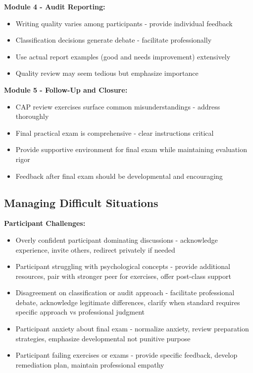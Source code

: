 \documentclass[11pt,a4paper]{article}
\begin{document}
\textbf{Module 4 - Audit Reporting:}
\begin{itemize}
\item Writing quality varies among participants - provide individual feedback
\item Classification decisions generate debate - facilitate professionally
\item Use actual report examples (good and needs improvement) extensively
\item Quality review may seem tedious but emphasize importance
\end{itemize}

\textbf{Module 5 - Follow-Up and Closure:}
\begin{itemize}
\item CAP review exercises surface common misunderstandings - address thoroughly
\item Final practical exam is comprehensive - clear instructions critical
\item Provide supportive environment for final exam while maintaining evaluation rigor
\item Feedback after final exam should be developmental and encouraging
\end{itemize}

\subsection{Managing Difficult Situations}

\textbf{Participant Challenges:}
\begin{itemize}
\item Overly confident participant dominating discussions - acknowledge experience, invite others, redirect privately if needed
\item Participant struggling with psychological concepts - provide additional resources, pair with stronger peer for exercises, offer post-class support
\item Disagreement on classification or audit approach - facilitate professional debate, acknowledge legitimate differences, clarify when standard requires specific approach vs professional judgment
\item Participant anxiety about final exam - normalize anxiety, review preparation strategies, emphasize developmental not punitive purpose
\item Participant failing exercises or exams - provide specific feedback, develop remediation plan, maintain professional empathy
\end{itemize}
\end{document}
